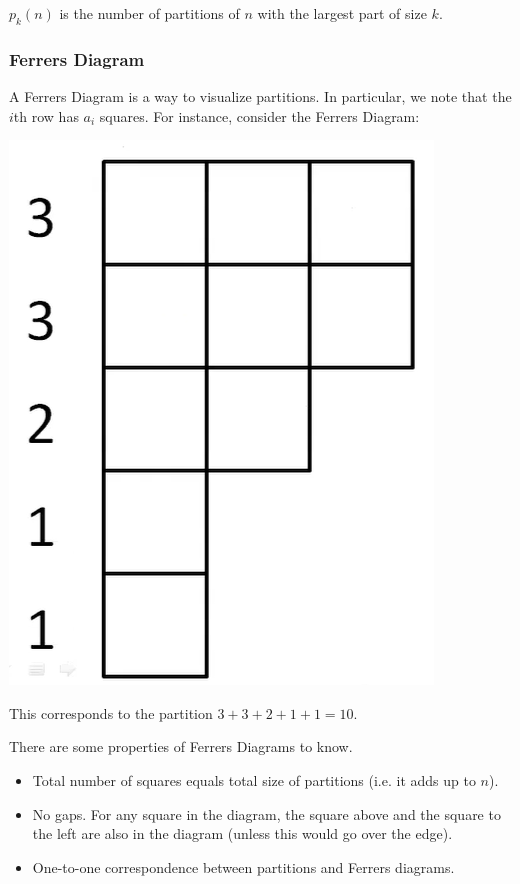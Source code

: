 \documentclass[letterpaper]{article}
\begin{document}
\begin{theorem}{}{}
    $p_{k}(n)$ is the number of partitions of $n$ with the largest part of size $k$.
\end{theorem}

\subsubsection{Ferrers Diagram}
A Ferrers Diagram is a way to visualize partitions. In particular, we note that the $i$th row has $a_i$ squares. For instance, consider the Ferrers Diagram:
\begin{center}
    \includegraphics[scale=0.3]{img/ferrer.PNG}
\end{center}
This corresponds to the partition $3 + 3 + 2 + 1 + 1 = 10$. 

\bigskip 

There are some properties of Ferrers Diagrams to know.
\begin{itemize}
    \item Total number of squares equals total size of partitions (i.e. it adds up to $n$).
    \item No gaps. For any square in the diagram, the square above and the square to the left are also in the diagram (unless this would go over the edge). 
    \item One-to-one correspondence between partitions and Ferrers diagrams. 
\end{itemize}
\end{document}
